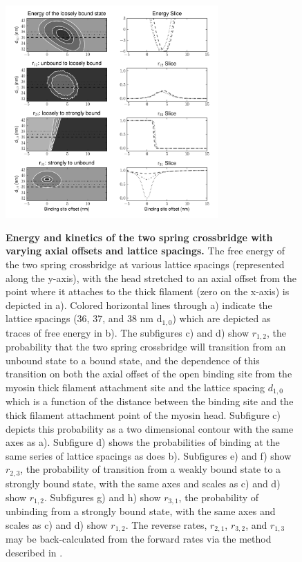 \documentclass[]{article}
\begin{document}
\begin{figure}[p]
    \begin{center}
    \includegraphics[width=3.2in]{../imgs/Figure2.pdf}
    \label{fig:2s}
    \caption{
        \textbf{Energy and kinetics of the two spring crossbridge with varying axial offsets and lattice spacings.} 
        The free energy of the two spring crossbridge at various lattice spacings (represented along the y-axis), with the head stretched to an axial offset from the point where it attaches to the thick filament (zero on the x-axis) is depicted in a). Colored horizontal lines through a) indicate the lattice spacings (36, 37, and 38 nm d$_{1,0}$) which are depicted as traces of free energy in b).
        The subfigures c) and d) show $r_{1,2}$, the probability that the two spring crossbridge will transition from an unbound state to a bound state, and the dependence of this transition on both the axial offset of the open binding site from the myosin thick filament attachment site and the lattice spacing $d_{1,0}$ which is a function of the distance between the binding site and the thick filament attachment point of the myosin head. Subfigure c) depicts this probability as a two dimensional contour with the same axes as a). Subfigure d) shows the probabilities of binding at the same series of lattice spacings as does b).
        Subfigures e) and f) show $r_{2,3}$, the probability of transition from a weakly bound state to a strongly bound state, with the same axes and scales as c) and d) show $r_{1,2}$.
        Subfigures g) and h) show $r_{3,1}$, the probability of unbinding from a strongly bound state, with the same axes and scales as c) and d) show $r_{1,2}$.
        The reverse rates, $r_{2,1}$, $r_{3,2}$, and $r_{1,3}$ may be back-calculated from the forward rates via the method described in \cite{Tanner:2007:pe115}.
    }
    \end{center}
\end{figure}
\end{document}
